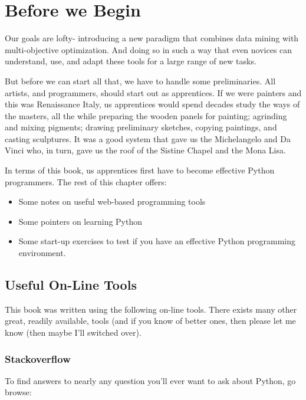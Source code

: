 \section{Before we Begin}\label{before-we-begin}

Our goals are lofty- introducing a new paradigm that combines data
mining with multi-objective optimization. And doing so in such a way
that even novices can understand, use, and adapt these tools for a large
range of new tasks.

But before we can start all that, we have to handle some preliminaries.
All artists, and programmers, should start out as apprentices. If we
were painters and this was Renaissance Italy, us apprentices would spend
decades study the ways of the masters, all the while preparing the
wooden panels for painting; agrinding and mixing pigments; drawing
preliminary sketches, copying paintings, and casting sculptures. It was
a good system that gave us the Michelangelo and Da Vinci who, in turn,
gave us the roof of the Sistine Chapel and the Mona Lisa.

In terms of this book, us apprentices first have to become effective
Python programmers. The rest of this chapter offers:

\begin{itemize}
\itemsep1pt\parskip0pt
\item
  Some notes on useful web-based programming tools
\item
  Some pointers on learning Python
\item
  Some start-up exercises to test if you have an effective Python
  programming environment.
\end{itemize}

\subsection{Useful On-Line Tools}\label{useful-on-line-tools}

This book was written using the following on-line tools. There exists
many other great, readily available, tools (and if you know of better
ones, then please let me know (then maybe I'll switched over).

\subsubsection{Stackoverflow}\label{stackoverflow}

To find answers to nearly any question you'll ever want to ask about
Python, go browse:

